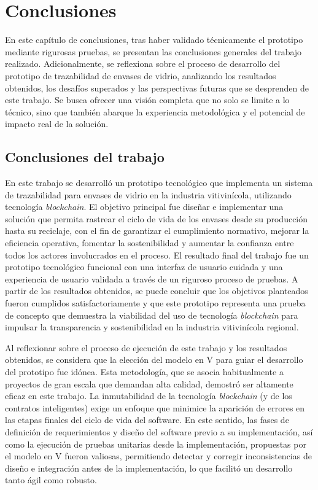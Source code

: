 \chapter[Conclusiones]{Conclusiones}
\label{cp:conclusions}

\parindent0pt

En este capítulo de conclusiones, tras haber validado técnicamente el prototipo mediante rigurosas pruebas, se presentan las conclusiones generales del trabajo realizado. Adicionalmente, se reflexiona sobre el proceso de desarrollo del prototipo de trazabilidad de envases de vidrio, analizando los resultados obtenidos, los desafíos superados y las perspectivas futuras que se desprenden de este trabajo. Se busca ofrecer una visión completa que no solo se limite a lo técnico, sino que también abarque la experiencia metodológica y el potencial de impacto real de la solución.

\section{Conclusiones del trabajo}

En este trabajo se desarrolló un prototipo tecnológico que implementa un sistema de trazabilidad para envases de vidrio en la industria vitivinícola, utilizando tecnología \textit{blockchain}. El objetivo principal fue diseñar e implementar una solución que permita rastrear el ciclo de vida de los envases desde su producción hasta su reciclaje, con el fin de garantizar el cumplimiento normativo, mejorar la eficiencia operativa, fomentar la sostenibilidad y aumentar la confianza entre todos los actores involucrados en el proceso. El resultado final del trabajo fue un prototipo tecnológico funcional con una interfaz de usuario cuidada y una experiencia de usuario validada a través de un riguroso proceso de pruebas. A partir de los resultados obtenidos, se puede concluir que los objetivos planteados fueron cumplidos satisfactoriamente y que este prototipo representa una prueba de concepto que demuestra la viabilidad del uso de tecnología \textit{blockchain} para impulsar la transparencia y sostenibilidad en la industria vitivinícola regional.

Al reflexionar sobre el proceso de ejecución de este trabajo y los resultados obtenidos, se considera que la elección del modelo en V para guiar el desarrollo del prototipo fue idónea. Esta metodología, que se asocia habitualmente a proyectos de gran escala que demandan alta calidad, demostró ser altamente eficaz en este trabajo. La inmutabilidad de la tecnología \textit{blockchain} (y de los contratos inteligentes) exige un enfoque que minimice la aparición de errores en las etapas finales del ciclo de vida del software. En este sentido, las fases de definición de requerimientos y diseño del software previo a su implementación, así como la ejecución de pruebas unitarias desde la implementación, propuestas por el modelo en V fueron valiosas, permitiendo detectar y corregir inconsistencias de diseño e integración antes de la implementación, lo que facilitó un desarrollo tanto ágil como robusto.

